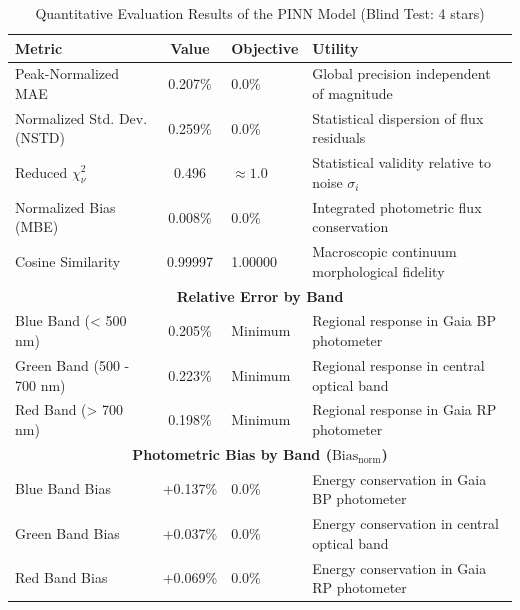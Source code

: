 
\begin{table}[htpb]
\centering
\caption{Quantitative Evaluation Results of the PINN Model (Blind Test: 4 stars)}
\label{tab:pinn_evaluation}
\begin{tabular}{lcll}
\hline
\textbf{Metric} & \textbf{Value} & \textbf{Objective} & \textbf{Utility} \\
\hline
Peak-Normalized MAE & 0.207\% & 0.0\% & Global precision independent of magnitude \\
Normalized Std. Dev. (NSTD) & 0.259\% & 0.0\% & Statistical dispersion of flux residuals \\
Reduced $\chi^2_\nu$ & 0.496 & $\approx 1.0$ & Statistical validity relative to noise $\sigma_i$ \\
Normalized Bias (MBE) & 0.008\% & 0.0\% & Integrated photometric flux conservation \\
Cosine Similarity & 0.99997 & 1.00000 & Macroscopic continuum morphological fidelity \\
\hline
\multicolumn{4}{c}{\textbf{Relative Error by Band}} \\
\hline
Blue Band (< 500 nm) & 0.205\% & Minimum & Regional response in Gaia BP photometer \\
Green Band (500 - 700 nm) & 0.223\% & Minimum & Regional response in central optical band \\
Red Band (> 700 nm) & 0.198\% & Minimum & Regional response in Gaia RP photometer \\
\hline
\multicolumn{4}{c}{\textbf{Photometric Bias by Band ($\text{Bias}_{\text{norm}}$)}} \\
\hline
Blue Band Bias & +0.137\% & 0.0\% & Energy conservation in Gaia BP photometer \\
Green Band Bias & +0.037\% & 0.0\% & Energy conservation in central optical band \\
Red Band Bias & +0.069\% & 0.0\% & Energy conservation in Gaia RP photometer \\
\hline
\end{tabular}
\end{table}
